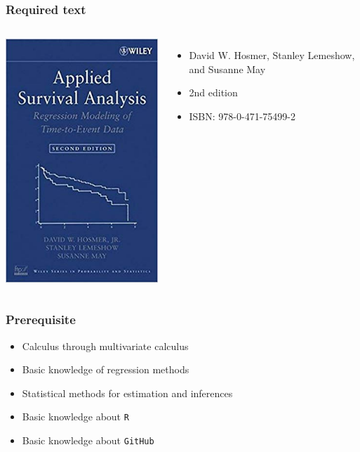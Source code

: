 \documentclass{beamer}
\begin{document}
\begin{frame}
\frametitle{Required text}
\begin{columns}
\begin{center}
\includegraphics[scale = .4]{coursebook}
\end{center}
\begin{itemize}
\item David W. Hosmer, Stanley Lemeshow, and Susanne May
\item 2nd edition
\item ISBN: 978-0-471-75499-2
\end{itemize}
\end{columns}
\end{frame}

\begin{frame}
\frametitle{Prerequisite}
\begin{itemize}
\item Calculus through multivariate calculus 
\item Basic knowledge of regression methods
\item Statistical methods for estimation and inferences
\item Basic knowledge about \texttt{R} 
\item Basic knowledge about \texttt{GitHub} 
\end{itemize}
\end{frame}
\end{document}
